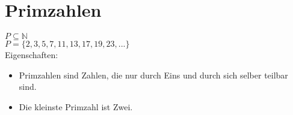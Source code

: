 \section{Primzahlen}

\hfill \break
$P \subseteq \mathbb{N}$\\
$P = \{2,3,5,7,11,13,17,19,23,...\}$\\


Eigenschaften:
\begin{itemize}
    \item Primzahlen sind Zahlen, die nur durch Eins und durch sich selber teilbar sind.
    \item Die kleinste Primzahl ist Zwei.
\end{itemize}


\break

\break



